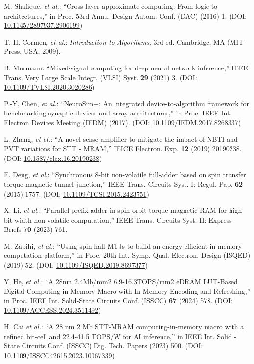 \documentclass[submit]{elex2024}%
\begin{document}
\begin{thebibliography}{99}
M. Shafique, {\it et al.}: ``Cross-layer approximate computing: From logic to architectures,'' in Proc. 53rd Annu. Design Autom. Conf. (DAC) (2016) 1. (DOI: \href{http://dx.doi.org/10.1145/2897937.2906199}{10.1145/2897937.2906199})

T. H. Cormen, {\it et al.}: {\it Introduction to Algorithms}, 3rd ed. Cambridge, MA (MIT Press, USA, 2009).

B. Murmann: ``Mixed-signal computing for deep neural network inference,'' IEEE Trans. Very Large Scale Integr. (VLSI) Syst. {\bf 29} (2021) 3. (DOI: \href{https://doi.org/10.1109/TVLSI.2020.3020286}{10.1109/TVLSI.2020.3020286})

P.-Y. Chen, {\it et al.}: ``NeuroSim+: An integrated device-to-algorithm framework for benchmarking synaptic devices and array architectures,'' in Proc. IEEE Int. Electron Devices Meeting (IEDM) (2017). (DOI: \href{https://doi.org/10.1109/IEDM.2017.8268337}{10.1109/IEDM.2017.8268337})

L. Zhang, {\it et al.}: ``A novel sense amplifier to mitigate the impact of NBTI and PVT variations for STT - MRAM,'' IEICE Electron. Exp. {\bf 12} (2019) 20190238. (DOI: \href{https://doi.org/10.1587/elex.16.20190238}{10.1587/elex.16.20190238})

E. Deng, {\it et al.}: ``Synchronous 8-bit non-volatile full-adder based on spin transfer torque magnetic tunnel junction,'' IEEE Trans. Circuits Syst. I: Regul. Pap. {\bf 62} (2015) 1757. (DOI: \href{https://doi.org/10.1109/TCSI.2015.2423751}{10.1109/TCSI.2015.2423751})

X. Li, {\it et al.}: ``Parallel-prefix adder in spin-orbit torque magnetic RAM for high bit-width non-volatile computation,'' IEEE Trans. Circuits Syst. II: Express Briefs {\bf 70} (2023) 761.

M. Zabihi, {\it et al.}: ``Using spin-hall MTJs to build an energy-efficient in-memory computation platform,'' in Proc. 20th Int. Symp. Qual. Electron. Design (ISQED) (2019) 52. (DOI: \href{https://doi.org/10.1109/ISQED.2019.8697377}{10.1109/ISQED.2019.8697377})

Y. He, {\it et al.}: ``A 28nm 2.4Mb/mm2 6.9-16.3TOPS/mm2 eDRAM LUT-Based Digital-Computing-in-Memory Macro with In-Memory Encoding and Refreshing,'' in Proc. IEEE Int. Solid-State Circuits Conf. (ISSCC) {\bf 67} (2024) 578. (DOI: \href{https://doi.org/10.1109/ACCESS.2024.3511492}{10.1109/ACCESS.2024.3511492})

H. Cai {\it et al.}: ``A 28 nm 2 Mb STT-MRAM computing-in-memory macro with a refined bit-cell and 22.4-41.5 TOPS/W for AI inference,'' in IEEE Int. Solid - State Circuits Conf. (ISSCC) Dig. Tech. Papers (2023) 500. (DOI: \href{https://doi.org/10.1109/ISSCC42615.2023.10067339}{10.1109/ISSCC42615.2023.10067339})

\end{thebibliography}
\end{document}

